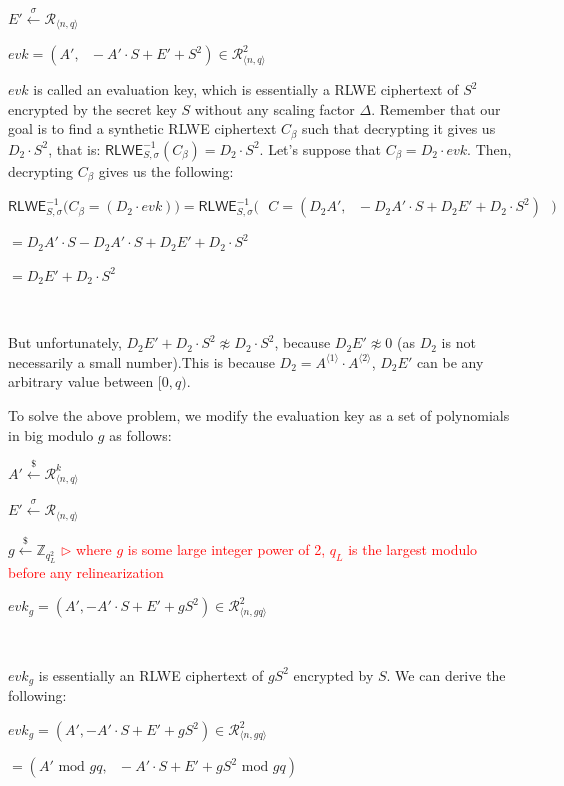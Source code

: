 $E' \xleftarrow{\sigma} \mathcal{R}_{\langle n,q\rangle }$


$\mathit{evk} = (A', \text{ } -A'\cdot S + E' +  S^2) \in \mathcal{R}_{\langle n, q\rangle}^2$


$\mathit{evk}$ is called an evaluation key, which is essentially a RLWE ciphertext of $ S^2$ encrypted by the secret key $S$ without any scaling factor $\Delta$. Remember that our goal is to find a synthetic RLWE ciphertext $C_\beta$ such that decrypting it gives us $D_2\cdot S^2$, that is: $\textsf{RLWE}_{S, \sigma}^{-1}(C_\beta) = D_2\cdot S^2$. Let's suppose  that $C_\beta = D_2 \cdot \mathit{evk}$. Then, decrypting $C_\beta$ gives us the following:

$\textsf{RLWE}_{S, \sigma}^{-1}\bm{(}C_\beta = (D_2 \cdot \mathit{evk})\bm{)} = \textsf{RLWE}_{S, \sigma}^{-1}\bm{(} \text{ } C = (D_2A', \text{ } -D_2A'\cdot S + D_2E' + D_2\cdot S^2) \text{ } \bm{)}$

$= D_2A'\cdot S - D_2A'\cdot S + D_2E' + D_2\cdot S^2$

$= D_2E' + D_2\cdot S^2$

$ $

But unfortunately, $D_2E' + D_2\cdot S^2 \not\approx D_2\cdot S^2$, because $D_2E' \not\approx 0$ (as $D_2$ is not necessarily a small number).This is because $D_2 = A^{\langle 1 \rangle} \cdot A^{\langle 2 \rangle}$, $D_2E'$ can be any arbitrary value between $[0, q)$. 


To solve the above problem, we modify the evaluation key as a set of polynomials in big modulo $g$ as follows:


$A'  \xleftarrow{\$} \mathcal{R}_{\langle n,q\rangle }^{k}$

$E' \xleftarrow{\sigma} \mathcal{R}_{\langle n,q\rangle }$

$g \xleftarrow{\$} \mathbb{Z}_{q_L^2}$ \textcolor{red}{  $\rhd$ where $g$ is some large integer power of 2, $q_L$ is the largest modulo before any relinearization}

$\mathit{evk_g} = (A', -A'\cdot S + E' + g S^2) \in \mathcal{R}_{\langle n, gq\rangle}^2$

$ $

$\mathit{evk_g}$ is essentially an RLWE ciphertext of $g S^2$ encrypted by $S$. We can derive the following:

$\mathit{evk_g} = (A', -A'\cdot S + E' + g S^2) \in \mathcal{R}_{\langle n, gq\rangle}^2$

$= (A'  \text{ mod } gq, \text{ } -A'\cdot S + E' + g S^2 \text{ mod } gq)$

